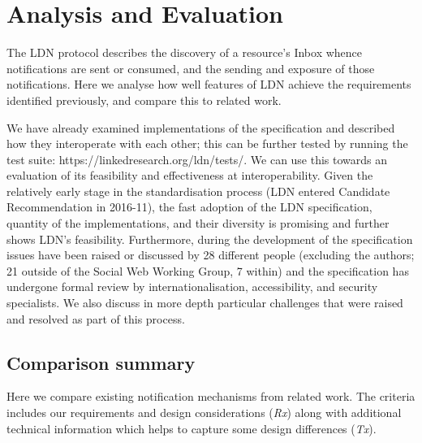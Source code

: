                     
                        \section{Analysis and Evaluation}
  \label{analysis-and-evaluation}

                        
                            
\par The LDN protocol describes the discovery of a resource’s Inbox whence notifications are sent or consumed, and the sending and exposure of those notifications. Here we analyse how well features of LDN achieve the \empty requirements identified previously, and compare this to related work.

                            
\par We have already examined \empty implementations of the specification and described how they interoperate with each other; this can be further tested by running the \empty test suite: https://linkedresearch.org/ldn/tests/. We can use this towards an evaluation of its feasibility and effectiveness at interoperability. Given the relatively early stage in the standardisation process (LDN entered Candidate Recommendation in 2016-11), the fast adoption of the LDN specification, quantity of the implementations, and their diversity is promising and further shows LDN’s feasibility. Furthermore, during the development of the specification issues have been raised or discussed by 28 different people (excluding the authors; 21 outside of the Social Web Working Group, 7 within) and the specification has undergone formal review by internationalisation, accessibility, and security specialists. We also discuss in more depth particular challenges that were raised and resolved as part of this process.

                            
                                \subsection{Comparison summary}
  \label{comparison-summary}

                                
                                    
\par Here we compare existing notification mechanisms from related work. The criteria includes our \empty requirements and design considerations ({\em Rx}) along with additional technical information which helps to capture some design differences ({\em Tx}).

